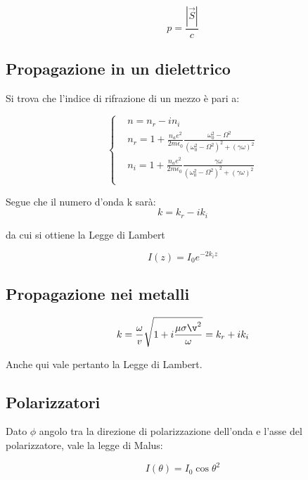 \documentclass{article}
\begin{document}
\begin{equation}
    p=\frac{|\Vec{S}|}{c}
\end{equation}

\subsection{Propagazione in un dielettrico}
Si trova che l'indice di rifrazione di un mezzo è pari a:

\begin{equation}
    \left\{
    \begin{aligned}
    & n=n_r-in_i \\
        & n_r= 1+ \frac{n_a e^2}{2 m \epsilon_0}\frac{\omega_0^2-\Omega^2}{
        (\omega_0^2-\Omega^2)^2+(\gamma\omega)^2
        } \\
        &  n_i= 1+ \frac{n_a e^2}{2 m \epsilon_0}\frac{\gamma\omega}{
        (\omega_0^2-\Omega^2)^2+(\gamma\omega)^2
        } \\
    \end{aligned}
    \right.
\end{equation}

Segue che il numero d'onda k sarà:
\begin{equation}
    k= k_r-ik_i
\end{equation}

da cui si ottiene la Legge di Lambert

\begin{equation}
    I(z)= I_0e^{-2k_iz}
\end{equation}

\subsection{Propagazione nei metalli}
\begin{equation}
    k=\frac{\omega}{v}\sqrt{1+i\frac{\mu\sigma\v^2}{\omega}}=k_r+ik_i
\end{equation}

Anche qui vale pertanto la Legge di Lambert.

\subsection{Polarizzatori}
Dato $\phi$ angolo tra la direzione di polarizzazione dell'onda e l'asse del polarizzatore, vale la legge di Malus:

\begin{equation}
    I(\theta)=I_0\cos{\theta}^2
\end{equation}
\end{document}

